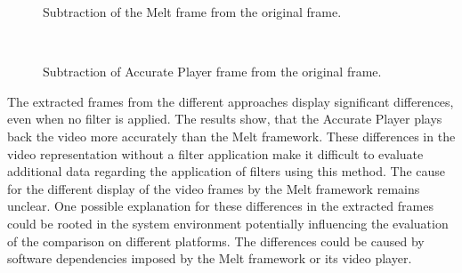\documentclass[../MasterThesis.tex]{subfiles}
\begin{document}
\begin{minipage}{0.48\textwidth}
	\begin{figure}[H]
		\begin{center}
			\caption[Subtraction of the Melt frame from the original frame.]{Subtraction of the Melt frame from the original frame.}
			\label{figure:oVSmelt}
		\end{center}
	\end{figure}
\end{minipage}\begin{minipage}{0.04\textwidth}
	\ 
\end{minipage}\begin{minipage}{0.48\textwidth}
	\begin{figure}[H]
		\begin{center}
			\caption[Subtraction of Accurate Player frame from the original frame.]{Subtraction of Accurate Player frame from the original frame.}
			\label{figure:oVSap}
		\end{center}
	\end{figure}
\end{minipage}








\vspace*{1.5em}
The extracted frames from the different approaches display significant differences, even when no filter is applied. 
The results show, that the Accurate Player plays back the video more accurately than the Melt framework.
These differences in the video representation without a filter application make it difficult to evaluate additional data regarding the application of filters using this method. The cause for the different display of the video frames by the Melt framework remains unclear.
%
%
One possible explanation for these differences in the extracted frames could be rooted in the system environment potentially influencing the evaluation of the comparison on different platforms. The differences could be caused by software dependencies imposed by the Melt framework or its video player.
\end{document}
